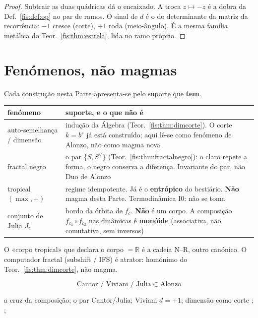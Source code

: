 \documentclass[livro.tex]{subfiles}
\begin{document}
\begin{proof}
Subtrair as duas quádricas dá o encaixado. A troca \(z\mapsto -z\) é a
dobra da Def.~\ref{fis:def:op} no par de ramos. O sinal de \(d\) é o
do determinante da matriz da recorrência: \(-1\) cresce (corte), \(+1\)
roda (meio-ângulo). É a mesma família metálica do
Teor.~\ref{fis:thm:estrela}, lida no ramo próprio.
\end{proof}

\section{Fenómenos, não magmas}\label{fis:alonzo-fenomenos}

\noindent Cada construção nesta Parte apresenta-se pelo suporte que
\textbf{tem}.

\begin{center}\small
\begin{tabular}{@{}>{\raggedright\arraybackslash}p{}
                >{\raggedright\arraybackslash}p{}@{}}
\toprule
fenómeno & suporte, e o que não é \\
\midrule
auto-semelhança / dimensão
  & indução da Álgebra (Teor.~\ref{fis:thm:dimcorte}). O corte \(k=b^{s}\)
    já está construído; aqui lê-se como fenómeno de Alonzo, não como
    magma nova \\
fractal negro
  & o par \(\{S,S^{\vee}\}\) (Teor.~\ref{fis:thm:fractalnegro}): o claro
    repete a forma, o negro conserva a diferença. Invariante do par,
    não Duo de Alonzo \\
tropical \((\max,+)\)
  & regime idempotente. Já é o \textbf{entrópico} do bestiário.
    \textbf{Não} magma desta Parte. Termodinâmica I0: não se toma \\
conjunto de Julia \(J_c\)
  & bordo da órbita de \(f_c\). \textbf{Não} é um corpo. A composição
    \(f_{c_1}\circ f_{c_2}\) nas dinâmicas é \textbf{monóide}
    (associativa, não comutativa, sem inversos) \\
\bottomrule
\end{tabular}
\end{center}

\noindent O «corpo tropical» que declara o corpo \(=\mathbb{R}\) é a
cadeia N--R, outro canónico. O computador fractal (subshift / IFS) é
atrator: homónimo do Teor.~\ref{fis:thm:dimcorte}, não magma.

\[
\boxed{\;
\text{Cantor / Viviani / Julia}
\;\subset\;
\text{Alonzo}
\;}
\]

        {a cruz da composição; o par Cantor/Julia; Viviani \(d=+1\); dimensão como corte}
        {; ; }
\end{document}
